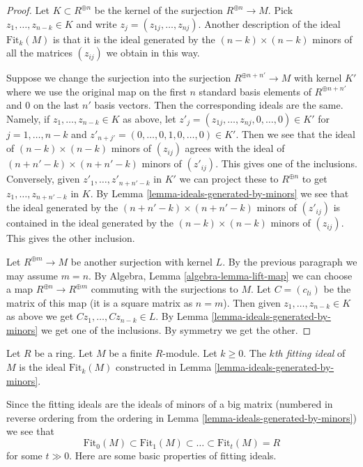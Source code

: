 \begin{proof}
Let $K \subset R^{\oplus n}$ be the kernel of the surjection
$R^{\oplus n} \to M$. Pick $z_1, \ldots, z_{n - k} \in K$
and write $z_j = (z_{1j}, \ldots, z_{nj})$.
Another description of the ideal $\text{Fit}_k(M)$
is that it is the ideal generated by the $(n - k) \times (n - k)$ minors of
all the matrices $(z_{ij})$ we obtain in this way.

\medskip\noindent
Suppose we change the surjection into the surjection
$R^{\oplus n + n'} \to M$ with kernel $K'$ where we use the original
map on the first $n$ standard basis elements of $R^{\oplus n + n'}$
and $0$ on the last $n'$ basis vectors. Then the corresponding ideals
are the same. Namely, if $z_1, \ldots, z_{n - k} \in K$ as above,
let $z'_j = (z_{1j}, \ldots, z_{nj}, 0, \ldots, 0) \in K'$ for
$j = 1, \ldots, n - k$ and
$z'_{n + j'} = (0, \ldots, 0, 1, 0, \ldots, 0) \in K'$. Then we see that
the ideal of $(n - k) \times (n - k)$ minors of $(z_{ij})$ agrees
with the ideal of $(n + n' - k) \times (n + n' - k)$ minors of
$(z'_{ij})$. This gives one of the inclusions.
Conversely, given  $z'_1, \ldots, z'_{n + n' - k}$
in $K'$ we can project these to $R^{\oplus n}$ to get
$z_1, \ldots, z_{n + n' - k}$ in $K$. By
Lemma \ref{lemma-ideals-generated-by-minors}
we see that the ideal generated by the
$(n + n' - k) \times (n + n' - k)$ minors of
$(z'_{ij})$ is contained in the ideal generated by the
$(n - k) \times (n - k)$ minors of $(z_{ij})$. This gives the
other inclusion.

\medskip\noindent
Let $R^{\oplus m} \to M$ be another surjection with kernel $L$.
By the previous paragraph we may assume $m = n$.
By Algebra, Lemma \ref{algebra-lemma-lift-map} we can choose a map
$R^{\oplus n} \to R^{\oplus m}$ commuting with the surjections to $M$.
Let $C = (c_{li})$ be the matrix of this map (it is a square
matrix as $n = m$). Then given
$z_1, \ldots, z_{n - k} \in K$ as above we get
$Cz_1, \ldots, Cz_{n - k} \in L$. By
Lemma \ref{lemma-ideals-generated-by-minors} we get one of the
inclusions. By symmetry we get the other.
\end{proof}

\begin{definition}
\label{definition-fitting-ideal}
Let $R$ be a ring. Let $M$ be a finite $R$-module. Let $k \geq 0$.
The {\it $k$th fitting ideal} of $M$ is the ideal $\text{Fit}_k(M)$
constructed in Lemma \ref{lemma-ideals-generated-by-minors}.
\end{definition}

\noindent
Since the fitting ideals are the ideals of minors of a big matrix
(numbered in reverse ordering from the ordering in
Lemma \ref{lemma-ideals-generated-by-minors})
we see that
$$
\text{Fit}_0(M) \subset \text{Fit}_1(M) \subset \ldots
\subset \text{Fit}_t(M) = R
$$
for some $t \gg 0$. Here are some basic properties of fitting ideals.

